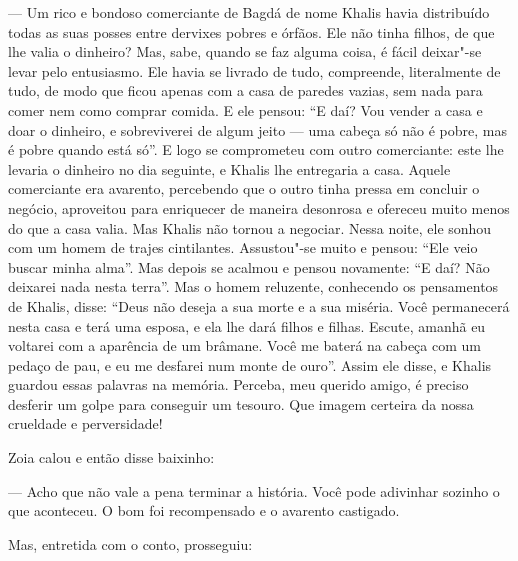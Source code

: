 --- Um rico e bondoso comerciante de Bagdá de nome Khalis havia
distribuído todas as suas posses entre dervixes pobres e órfãos. Ele não
tinha filhos, de que lhe valia o dinheiro? Mas, sabe, quando se faz
alguma coisa, é fácil deixar"-se levar pelo entusiasmo. Ele havia se
livrado de tudo, compreende, literalmente de tudo, de modo que ficou
apenas com a casa de paredes vazias, sem nada para comer nem como
comprar comida. E ele pensou: ``E daí? Vou vender a casa e doar o
dinheiro, e sobreviverei de algum jeito --- uma cabeça só não é pobre,
mas é pobre quando está só''. E logo se comprometeu com outro
comerciante: este lhe levaria o dinheiro no dia seguinte, e Khalis lhe
entregaria a casa. Aquele comerciante era avarento, percebendo que
o outro tinha pressa em concluir o negócio, aproveitou para enriquecer de
maneira desonrosa e ofereceu muito menos do que a casa valia. Mas Khalis
não tornou a negociar. Nessa noite, ele sonhou com um homem de trajes
cintilantes. Assustou"-se muito e pensou: ``Ele veio buscar minha alma''.
Mas depois se acalmou e pensou novamente: ``E daí? Não deixarei nada
nesta terra''. Mas o homem reluzente, conhecendo os pensamentos de
Khalis, disse: ``Deus não deseja a sua morte e a sua miséria. Você
permanecerá nesta casa e terá uma esposa, e ela lhe dará filhos e
filhas. Escute, amanhã eu voltarei com a aparência de um brâmane. Você
me baterá na cabeça com um pedaço de pau, e eu me desfarei num monte de
ouro''. Assim ele disse, e Khalis guardou essas palavras na memória.
Perceba, meu querido amigo, é preciso desferir um golpe para conseguir
um tesouro. Que imagem certeira da nossa crueldade e perversidade! 

Zoia calou e então disse baixinho:

--- Acho que não vale a pena terminar a história. Você pode adivinhar
sozinho o que aconteceu. O bom foi recompensado e o avarento castigado.

Mas, entretida com o conto, prosseguiu:

